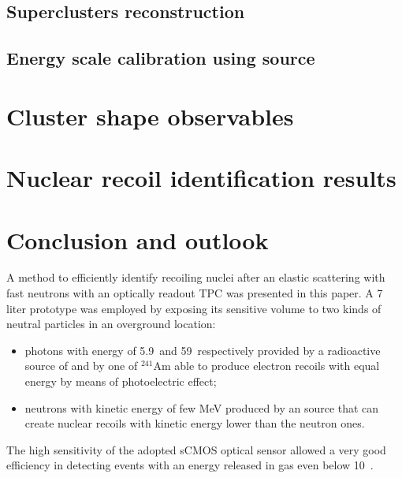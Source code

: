 \documentclass[12pt]{iopart}
\begin{document}
\subsection{Superclusters reconstruction}
\label{sec:supercl}


\clearpage

\subsection{Energy scale calibration using \fe source}
\label{sec:calibration}



\section{Cluster shape observables}
\label{sec:clustershapes}


 
\section{Nuclear recoil identification results}
\label{sec:results}

 
\clearpage


 \section{Conclusion and outlook}

A method to efficiently identify recoiling nuclei after an elastic
scattering with fast neutrons with an optically readout TPC was
presented in this paper.  A 7 liter prototype was employed by exposing
its sensitive volume to two kinds of neutral particles in an
overground location:
\begin{itemize}
\item photons with energy of 5.9~\keV and 59~\keV respectively
  provided by a radioactive source of \fe and by one of $^{241}$Am
  able to produce electron recoils with equal energy by means of
  photoelectric effect;
\item neutrons with kinetic energy of few MeV produced by an \ambe
  source that can create nuclear recoils with kinetic energy lower
  than the neutron ones.
\end{itemize}

The high sensitivity of the adopted sCMOS optical sensor allowed a
very good efficiency in detecting events with an energy released in
gas even below 10~\keV.
\end{document}
